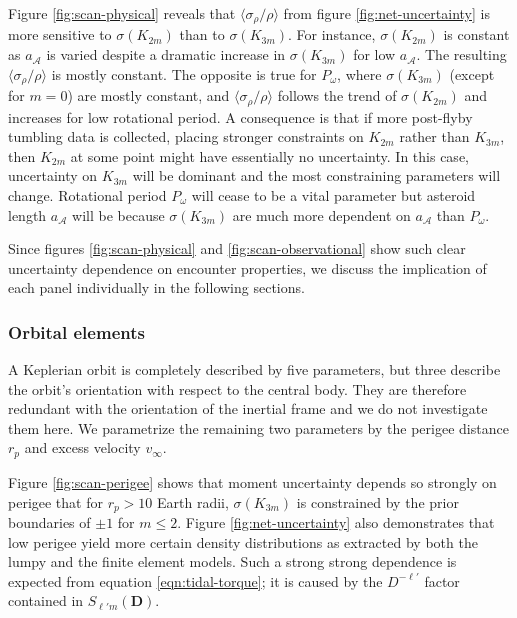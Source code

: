 \documentclass[fleqn,usenatbib]{mnras}
\begin{document}
Figure \ref{fig:scan-physical} reveals that $\langle \sigma_\rho / \rho \rangle$ from figure \ref{fig:net-uncertainty} is more sensitive to $\sigma (K_{2m})$ than to $\sigma(K_{3m})$. For instance, $\sigma(K_{2m})$ is constant as $a_\mathcal{A}$ is varied despite a dramatic increase in $\sigma(K_{3m})$ for low $a_\mathcal{A}$. The resulting $\langle \sigma_\rho / \rho \rangle$ is mostly constant. The opposite is true for $P_\omega$, where $\sigma(K_{3m})$ (except for $m=0$) are mostly constant, and $\langle \sigma_\rho / \rho \rangle$ follows the trend of $\sigma(K_{2m})$ and increases for low rotational period. A consequence is that if more post-flyby tumbling data is collected, placing stronger constraints on $K_{2m}$ rather than $K_{3m}$, then $K_{2m}$ at some point might have essentially no uncertainty. In this case, uncertainty on $K_{3m}$ will be dominant and the most constraining parameters will change. Rotational period $P_\omega$ will cease to be a vital parameter but asteroid length $a_\mathcal{A}$ will be because $\sigma(K_{3m})$ are much more dependent on $a_\mathcal{A}$ than $P_\omega$.

Since figures \ref{fig:scan-physical} and \ref{fig:scan-observational} show such clear uncertainty dependence on encounter properties, we discuss the implication of each panel individually in the following sections.

\subsubsection{Orbital elements}
\label{sec:scan-orbit}
A Keplerian orbit is completely described by five parameters, but three describe the orbit's orientation with respect to the central body. They are therefore redundant with the orientation of the inertial frame and we do not investigate them here. We parametrize the remaining two parameters by the perigee distance $r_p$ and excess velocity $v_\infty$.

Figure \ref{fig:scan-perigee} shows that moment uncertainty depends so strongly on perigee that for $r_p > 10$ Earth radii, $\sigma(K_{3m})$ is constrained by the prior boundaries of $\pm 1$ for $m \leq 2$. Figure \ref{fig:net-uncertainty} also demonstrates that low perigee yield more certain density distributions as extracted by both the lumpy and the finite element models. Such a strong strong dependence is expected from equation \ref{eqn:tidal-torque}; it is caused by the $D^{-\ell'}$ factor contained in $S_{\ell' m}(\bm D)$.
\end{document}
